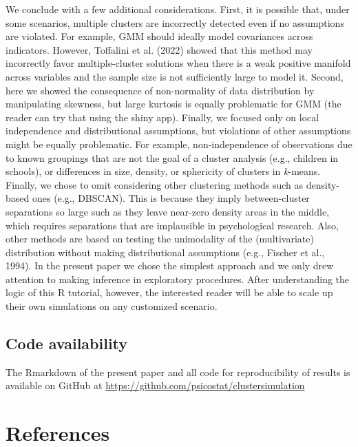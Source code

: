 \documentclass[
  man,floatsintext]{apa7}
\begin{document}
We conclude with a few additional considerations. First, it is possible that, under some scenarios, multiple clusters are incorrectly detected even if no assumptions are violated. For example, GMM should ideally model covariances across indicators. However, Toffalini et al. (2022) showed that this method may incorrectly favor multiple-cluster solutions when there is a weak positive manifold across variables and the sample size is not sufficiently large to model it. Second, here we showed the consequence of non-normality of data distribution by manipulating skewness, but large kurtosis is equally problematic for GMM (the reader can try that using the shiny app). Finally, we focused only on local independence and distributional assumptions, but violations of other assumptions might be equally problematic. For example, non-independence of observations due to known groupings that are not the goal of a cluster analysis (e.g., children in schools), or differences in size, density, or sphericity of clusters in \emph{k}-means. Finally, we chose to omit considering other clustering methods such as density-based ones (e.g., DBSCAN). This is because they imply between-cluster separations so large such as they leave near-zero density areas in the middle, which requires separations that are implausible in psychological research.
Also, other methods are based on testing the unimodality of the (multivariate) distribution without making distributional assumptions (e.g., Fischer et al., 1994). In the present paper we chose the simplest approach and we only drew attention to making inference in exploratory procedures. After understanding the logic of this R tutorial, however, the interested reader will be able to scale up their own simulations on any customized scenario.

\hypertarget{code-availability}{%
\subsection{Code availability}\label{code-availability}}

The Rmarkdown of the present paper and all code for reproducibility of results is available on GitHub at \url{https://github.com/psicostat/clustersimulation}

\newpage

\hypertarget{references}{%
\section{References}\label{references}}
\end{document}
